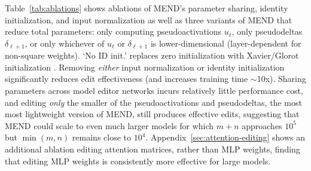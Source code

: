 \documentclass{article}
\makeatletter
\newcommand{\name}{MEND}
\newcommand{\rebuttal}[1]{#1}
\let\origsubsection\subsection
\renewcommand\subsection{\@ifstar{\starsubsection}{\nostarsubsection}}
\newcommand\nostarsubsection[1]
{\subsectionprelude\origsubsection{#1}\subsectionpostlude}
\newcommand\starsubsection[1]
{\subsectionprelude\origsubsection*{#1}\subsectionpostlude}
\newcommand\subsectionprelude{%
  \vspace{-1.5mm}
}
\newcommand\subsectionpostlude{%
  \vspace{-1.5mm}
}
\makeatother
\begin{document}
\subsection{Ablations \& {\name} Variants}
\label{sec:ablations}

\rebuttal{Table~\ref{tab:ablations} shows ablations of \name's parameter sharing, identity initialization, and input normalization as well as three variants of {\name} that reduce total parameters: only computing pseudoactivations $u_\ell$, only pseudodeltas $\delta_{\ell+1}$, or only whichever of $u_\ell$ or $\delta_{\ell+1}$ is lower-dimensional (layer-dependent for non-square weights). `No ID init.' replaces zero initialization with Xavier/Glorot initialization \citep{pmlr-v9-glorot10a}. Removing \textit{either} input normalization or identity initialization significantly reduces edit effectiveness (and increases training time $\sim$10x). Sharing parameters across model editor networks incurs relatively little performance cost, and editing \textit{only} the smaller of the pseudoactivations and pseudodeltas, the most most lightweight version of \name, still produces effective edits, suggesting that {\name} could scale to even much larger models for which $m+n$ approaches $10^5$ \citep{brown2020language} but $\min(m,n)$ remains close to $10^4$. Appendix~\ref{sec:attention-editing} shows an additional ablation editing attention matrices, rather than MLP weights, finding that editing MLP weights is consistently more effective for large models.}
\end{document}
